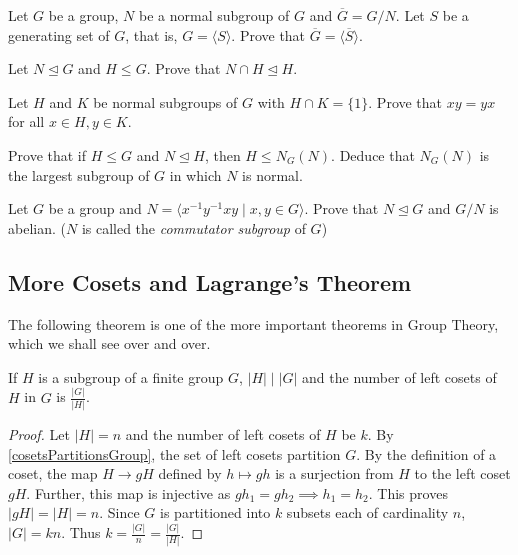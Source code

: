 \begin{exercise}
\label{barGeneratorsToGetBar}
    Let $G$ be a group, $N$ be a normal subgroup of $G$ and $\overline G=G/N$. Let $S$ be a generating set of $G$, that is, $G=\langle S\rangle$. Prove that $\overline G=\langle\overline S\rangle$.
\end{exercise}

\begin{exercise}
    Let $N\unlhd G$ and $H\leq G$. Prove that $N\cap H\unlhd H$.
\end{exercise}

\begin{exercise}
    Let $H$ and $K$ be normal subgroups of $G$ with $H\cap K=\{1\}$. Prove that $xy=yx$ for all $x\in H, y\in K$.
\end{exercise}

\begin{exercise}
    Prove that if $H\leq G$ and $N\unlhd H$, then $H\leq N_G(N)$. Deduce that $N_G(N)$ is the largest subgroup of $G$ in which $N$ is normal.
\end{exercise}

\begin{exercise}
    Let $G$ be a group and $N=\langle x^{-1}y^{-1}xy\mid x,y\in G\rangle$. Prove that $N\unlhd G$ and $G/N$ is abelian. ($N$ is called the \textit{commutator subgroup} of $G$)
\end{exercise}

\subsection{More Cosets and Lagrange's Theorem}

The following theorem is one of the more important theorems in Group Theory, which we shall see over and over.

\begin{theorem}
\label{LagrangesTheorem}
    If $H$ is a subgroup of a finite group $G$, $|H|\mid |G|$ and the number of left cosets of $H$ in $G$ is $\frac{|G|}{|H|}$.
\end{theorem}
\begin{proof}
    Let $|H|=n$ and the number of left cosets of $H$ be $k$. By \ref{cosetsPartitionsGroup}, the set of left cosets partition $G$. By the definition of a coset, the map $H\to gH$ defined by $h\mapsto gh$ is a surjection from $H$ to the left coset $gH$. Further, this map is injective as $gh_1=gh_2\implies h_1=h_2$. This proves $|gH|=|H|=n$. Since $G$ is partitioned into $k$ subsets each of cardinality $n$, $|G|=kn$. Thus $k=\frac{|G|}{n}=\frac{|G|}{|H|}$.
\end{proof}

